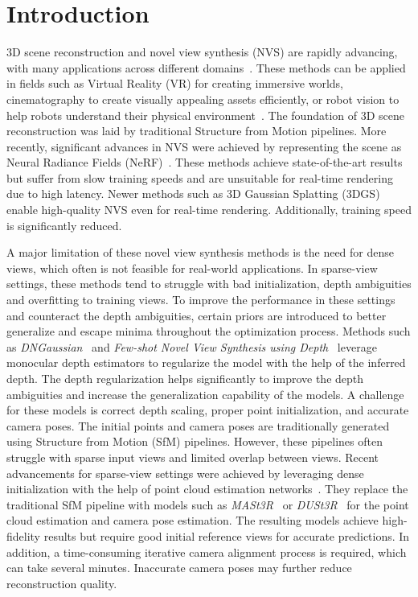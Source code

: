 \section{Introduction}
3D scene reconstruction and novel view synthesis (NVS) are rapidly advancing, with many applications across different domains~\cite{EVALScenReconstruction2024}.
These methods can be applied in fields such as Virtual Reality (VR) for creating immersive worlds, cinematography to create visually appealing assets efficiently, or
robot vision to help robots understand their physical environment~\cite{SLAMROBOT2021}.
The foundation of 3D scene reconstruction was laid by traditional Structure from Motion pipelines. More recently, significant advances in NVS were achieved by representing the scene as Neural Radiance Fields (NeRF)~\cite{NeRFOriginal}. These methods achieve state-of-the-art results but suffer from slow training speeds and are unsuitable for real-time rendering due to high latency. Newer methods such as 3D Gaussian Splatting (3DGS)~\cite{3dgs2023} enable high-quality NVS even for real-time rendering. Additionally, training speed is significantly reduced.

A major limitation of these novel view synthesis methods is the need for dense views, which often is not feasible for real-world applications. In sparse-view settings, these methods tend to struggle with bad initialization, depth ambiguities and overfitting to training views. To improve the performance in these settings and counteract the depth ambiguities, certain priors are introduced to better generalize and escape minima throughout the optimization process. Methods such as \textit{DNGaussian}~\cite{DNGaussian} and \textit{Few-shot Novel View Synthesis using Depth}~\cite{few-shotNVS3DGS} leverage monocular depth estimators to regularize the model with the help of the inferred depth. The depth regularization helps significantly to improve the depth ambiguities and increase the generalization capability of the models. A challenge for these models is correct depth scaling, proper point initialization, and accurate camera poses. The initial points and camera poses are traditionally generated using Structure from Motion (SfM) pipelines. However, these pipelines often struggle with sparse input views and limited overlap between views. Recent advancements for sparse-view settings were achieved by leveraging dense initialization with the help of point cloud estimation networks~\cite{InstantSplat, InternGS, SparseGS}. They replace the traditional SfM pipeline with models such as \textit{MASt3R}~\cite{mastrsfm2025} or \textit{DUSt3R}~\cite{dust3r_cvpr24} for the point cloud estimation and camera pose estimation.
The resulting models achieve high-fidelity results but require good initial reference views for accurate predictions. In addition, a time-consuming iterative camera alignment process is required, which can take several minutes. Inaccurate camera poses may further reduce reconstruction quality.

